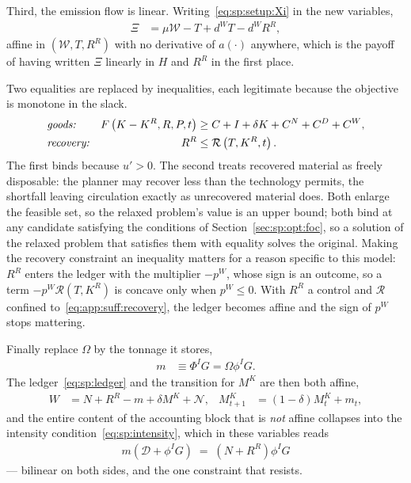 Third, the emission flow is linear. Writing~\eqref{eq:sp:setup:Xi} in the new variables,
\begin{align}
\Xi &= \mu\mathcal W-T+d^WT-d^WR^R,
\label{eq:app:suff:Xi-linear}
\end{align}
affine in $\left(\mathcal W,T,R^R\right)$ with no derivative of $a\left(\cdot\right)$ anywhere, which is the payoff of having written $\Xi$ linearly in $H$ and $R^R$ in the first place.

 Two equalities are replaced by inequalities, each legitimate because the objective is monotone in the slack.
\begin{align}
&\text{\emph{goods:}} & F\left(K-K^R,R,P,t\right) &\ge C+I+\delta K+C^N+C^D+C^W,
\label{eq:app:suff:goods}
\\
&\text{\emph{recovery:}} & R^R &\le \mathcal R\left(T,K^R,t\right).
\label{eq:app:suff:recovery}
\end{align}
The first binds because $u'>0$. The second treats recovered material as freely disposable: the planner may recover less than the technology permits, the shortfall leaving circulation exactly as unrecovered material does. Both enlarge the feasible set, so the relaxed problem's value is an upper bound; both bind at any candidate satisfying the conditions of Section~\ref{sec:sp:opt:foc}, so a solution of the relaxed problem that satisfies them with equality solves the original. Making the recovery constraint an inequality matters for a reason specific to this model: $R^R$ enters the ledger with the multiplier $-p^W$, whose sign is an outcome, so a term $-p^W\mathcal R\left(T,K^R\right)$ is concave only when $p^W\le0$. With $R^R$ a control and $\mathcal R$ confined to~\eqref{eq:app:suff:recovery}, the ledger becomes affine and the sign of $p^W$ stops mattering.

 Finally replace $\Omega$ by the tonnage it stores,
\begin{align}
m &\equiv \Phi^IG=\Omega\phi^IG .
\label{eq:app:suff:mdef}
\end{align}
The ledger~\eqref{eq:sp:ledger} and the transition for $M^K$ are then both affine,
\begin{align}
W &= N+R^R-m+\delta M^K+\mathcal N,
&
M^K_{t+1} &= \left(1-\delta\right)M^K_t+m_t,
\label{eq:app:suff:ledger-affine}
\end{align}
and the entire content of the accounting block that is \emph{not} affine collapses into the intensity condition~\eqref{eq:sp:intensity}, which in these variables reads
\begin{align}
\boxed{\;m\left(\mathcal D+\phi^IG\right) \;=\; \left(N+R^R\right)\phi^IG\;}
\label{eq:app:suff:intensity}
\end{align}
--- bilinear on both sides, and the one constraint that resists.

